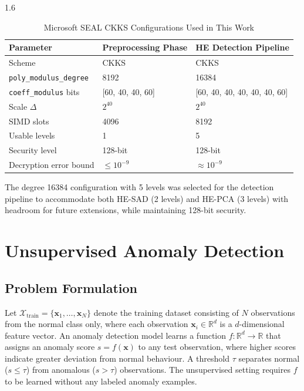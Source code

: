 \begin{spacing}{1.6}
\begin{table}[H]
\centering
\caption{Microsoft SEAL CKKS Configurations Used in This Work}
\label{tab:ckks_config}
\begin{tabular}{lll}
\toprule
\textbf{Parameter} & \textbf{Preprocessing Phase} & \textbf{HE Detection Pipeline} \\
\midrule
Scheme & CKKS & CKKS \\
\texttt{poly\_modulus\_degree} & 8192 & 16384 \\
\texttt{coeff\_modulus} bits & [60, 40, 40, 60] & [60, 40, 40, 40, 40, 40, 60] \\
Scale $\Delta$ & $2^{40}$ & $2^{40}$ \\
SIMD slots & 4096 & 8192 \\
Usable levels & 1 & 5 \\
Security level & 128-bit & 128-bit \\
Decryption error bound & $\leq 10^{-9}$ & $\approx 10^{-9}$ \\
\bottomrule
\end{tabular}
\end{table}

The degree 16384 configuration with 5 levels was selected for the detection
pipeline to accommodate both HE-SAD (2 levels) and HE-PCA (3 levels) with
headroom for future extensions, while maintaining 128-bit security.

\section{Unsupervised Anomaly Detection}

\subsection{Problem Formulation}

Let $\mathcal{X}_\text{train} = \{\mathbf{x}_1, \ldots, \mathbf{x}_N\}$ denote
the training dataset consisting of $N$ observations from the normal class only,
where each observation $\mathbf{x}_i \in \mathbb{R}^d$ is a $d$-dimensional
feature vector. An anomaly detection model learns a function $f: \mathbb{R}^d
\to \mathbb{R}$ that assigns an anomaly score $s = f(\mathbf{x})$ to any test
observation, where higher scores indicate greater deviation from normal
behaviour. A threshold $\tau$ separates normal ($s \leq \tau$) from anomalous
($s > \tau$) observations. The unsupervised setting requires $f$ to be learned
without any labeled anomaly examples.


\end{spacing}
